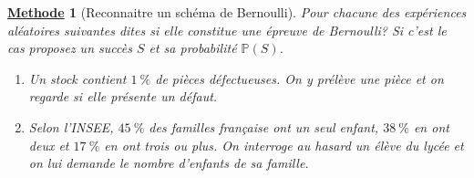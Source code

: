 \documentclass[10pt,a4paper]{article}
\theoremstyle{break}
\newtheorem{Meth}{\underline{Methode}}
\begin{document}
\begin{Meth}[Reconnaitre un schéma de Bernoulli]
	Pour chacune des expériences aléatoires suivantes dites si elle constitue une épreuve de Bernoulli? Si c'est le cas proposez un succès $S$ et sa probabilité $\mathbb{P}(S)$.
	
	\begin{enumerate}
		\item Un stock contient $1\ \%$ de pièces défectueuses. On y prélève une pièce et on regarde si elle présente un défaut.
		\item Selon l'INSEE, $45\ \%$ des familles française ont un seul enfant, $38\ \%$ en ont deux et $17\ \%$ en ont trois ou plus. On interroge au hasard un élève du lycée et on lui demande le nombre d'enfants de sa famille.
	\end{enumerate}
\end{Meth}
\end{document}
